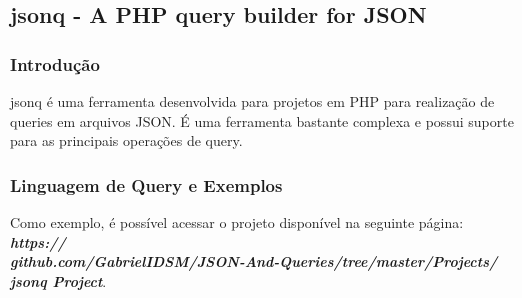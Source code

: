\documentclass[a4paper, 12pt] {article}
\begin{document}
		\subsection{jsonq - A PHP query builder for JSON}
			\subsubsection{Introdução}
				jsonq é uma ferramenta desenvolvida para projetos em PHP para realização de queries em arquivos JSON. É uma ferramenta bastante complexa e possui suporte para as principais operações de query.
			\subsubsection{Linguagem de Query e Exemplos}
				Como exemplo, é possível acessar o projeto disponível na seguinte página: \textbf{\textit{https://\\github.com/GabrielIDSM/JSON-And-Queries/tree/master/Projects/\\jsonq Project}}.
\end{document}
